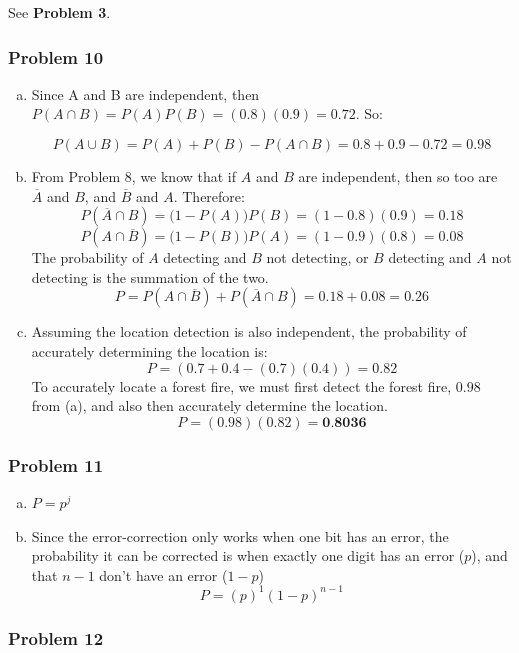 \documentclass[11pt]{extarticle}
\begin{document}
See \textbf{Problem 3}.

\subsubsection*{Problem 10}

\begin{enumerate}[(a)]
\item Since A and B are independent, then $P(A \cap B) = P(A)P(B) = (0.8)(0.9) = 0.72$. So:

$$P(A \cup B) = P(A) + P(B) - P(A \cap B) = 0.8 + 0.9 - 0.72 = \mathbf{0.98}$$

\item  From Problem 8, we know that if $A$ and $B$ are independent, then so too are $\overline{A}$ and $B$, and $\overline{B}$ and $A$. Therefore: 
$$P(\overline{A} \cap B) = \big(1-P(A)\big) P(B) = (1-0.8)(0.9) = 0.18$$
$$P(A \cap \overline{B}) = \big(1-P(B)\big) P(A) = (1-0.9)(0.8) = 0.08$$
The probability of $A$ detecting and $B$ not detecting, or $B$ detecting and $A$ not detecting is the summation of the two. 
$$ P = P(A \cap \overline{B}) + P(\overline{A} \cap B) = 0.18 + 0.08 = \mathbf{0.26}$$
\item Assuming the location detection is also independent, the probability of accurately determining the location is: $$ P = ( 0.7 + 0.4 - (0.7)(0.4)) = 0.82$$ 
 To accurately locate a forest fire, we must first detect the forest fire, $0.98$ from  (a), and also then accurately determine the location.
$$P = (0.98)(0.82)=  \textbf{0.8036} $$
\end{enumerate}

\subsubsection*{Problem 11}

\begin{enumerate}[(a)]
\item $ P = p^j $

\item Since the error-correction only works when one bit has an error, the probability it can be corrected is when exactly  one digit has an error ($p$), and that $n-1$ don't have an error ($1-p$)
$$ P = (p)^1(1-p)^{n-1}$$

\end{enumerate}
 
 \subsubsection*{Problem 12}
\end{document}
